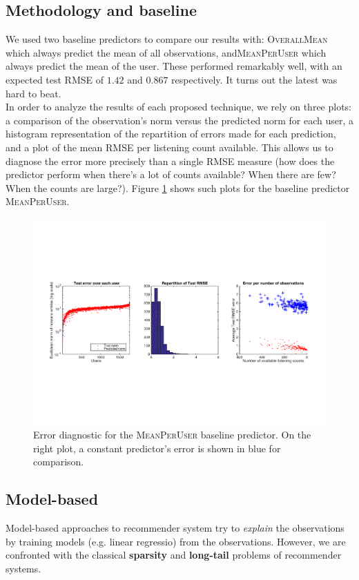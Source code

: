 \documentclass[10pt,a4paper]{article}
\begin{document}
  \subsection{Methodology and baseline}
  We used two baseline predictors to compare our results with: \textsc{OverallMean} which always predict the mean of all observations, and\textsc{MeanPerUser} which always predict the mean of the user. These performed remarkably well, with an expected test RMSE of $1.42$ and $0.867$ respectively. It turns out the latest was hard to beat.\\
  In order to analyze the results of each proposed technique, we rely on three plots: a comparison of the observation's norm versus the predicted norm for each user, a histogram representation of the repartition of errors made for each prediction, and a plot of the mean RMSE per listening count available. This allows us to diagnose the error more precisely than a single RMSE measure (how does the predictor perform when there's a lot of counts available? When there are few? When the counts are large?). Figure \ref{fig:baseline-predictor-plots} shows such plots for the baseline predictor \textsc{MeanPerUser}.

  \begin{figure}[ht]
    \center
      \includegraphics[width=14cm]{figures/recommendation/baseline-predictor-plots.pdf}
    \caption{Error diagnostic for the \textsc{MeanPerUser} baseline predictor. On the right plot, a constant predictor's error is shown in blue for comparison.}
    \label{fig:baseline-predictor-plots}
  \end{figure}


  \subsection{Model-based}
  Model-based approaches to recommender system try to \textit{explain} the observations by training models (e.g. linear regressio) from the observations. However, we are confronted with the classical \textbf{sparsity} and \textbf{long-tail} problems of recommender systems.\\
\end{document}
